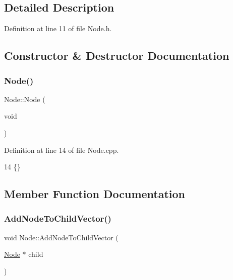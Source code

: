 \subsection{Detailed Description}


Definition at line 11 of file Node.\+h.



\subsection{Constructor \& Destructor Documentation}
\mbox{\label{classNode_ad7a34779cad45d997bfd6d3d8043c75f}} 
\subsubsection{\texorpdfstring{Node()}{Node()}}
{\footnotesize\ttfamily Node\+::\+Node (\begin{DoxyParamCaption}\item[{void}]{ }\end{DoxyParamCaption})}



Definition at line 14 of file Node.\+cpp.


\begin{DoxyCode}
14 \{\}
\end{DoxyCode}


\subsection{Member Function Documentation}
\mbox{\label{classNode_aef73af92aa3046218f83ed67a7996188}} 
\subsubsection{\texorpdfstring{Add\+Node\+To\+Child\+Vector()}{AddNodeToChildVector()}}
{\footnotesize\ttfamily void Node\+::\+Add\+Node\+To\+Child\+Vector (\begin{DoxyParamCaption}\item[{\hyperlink{classNode}{Node} $\ast$}]{child }\end{DoxyParamCaption})}



